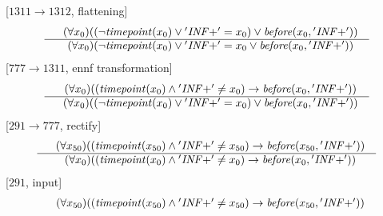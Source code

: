 \documentclass[border=10pt,preview,multi,varwidth=\maxdimen]{standalone}
\newenvironment{VampireStep}{}{}
\newenvironment{VampireInference}{%
   \begin{array}{c}}{\end{array}}
\newenvironment{VampirePremise}%
   {\begin{array}{l}}%
   {\end{array}}
\newenvironment{VampireConclusion}%
   {\begin{array}{l}}%
   {\end{array}}
\newcommand{\VConclusionSeparator}{\\ \hline}
\newcommand{\Vor}{\vee}
\newcommand{\Vand}{\wedge}
\newcommand{\Vimp}{\rightarrow}
\begin{document}
\begin{VampireStep}
[$1311\rightarrow 1312$, flattening]\\
\[\begin{VampireInference}
\begin{VampirePremise}%
~~(\forall x_{0} )((\neg \mathit{timepoint} (x_{0}) \Vor \mathit{'INF+'} = x_{0}) \Vor \mathit{before} (x_{0},\mathit{'INF+'}))
\end{VampirePremise}
\VConclusionSeparator
\begin{VampireConclusion}
~~(\forall x_{0} )(\neg \mathit{timepoint} (x_{0}) \Vor \mathit{'INF+'} = x_{0} \Vor \mathit{before} (x_{0},\mathit{'INF+'}))
\end{VampireConclusion}
\end{VampireInference}
\]
\end{VampireStep}
\begin{VampireStep}
[$777\rightarrow 1311$, ennf transformation]\\
\[\begin{VampireInference}
\begin{VampirePremise}%
~~(\forall x_{0} )((\mathit{timepoint} (x_{0}) \Vand \mathit{'INF+'} \neq x_{0}) \Vimp \mathit{before} (x_{0},\mathit{'INF+'}))
\end{VampirePremise}
\VConclusionSeparator
\begin{VampireConclusion}
~~(\forall x_{0} )((\neg \mathit{timepoint} (x_{0}) \Vor \mathit{'INF+'} = x_{0}) \Vor \mathit{before} (x_{0},\mathit{'INF+'}))
\end{VampireConclusion}
\end{VampireInference}
\]
\end{VampireStep}
\begin{VampireStep}
[$291\rightarrow 777$, rectify]\\
\[\begin{VampireInference}
\begin{VampirePremise}%
~~(\forall x_{50} )((\mathit{timepoint} (x_{50}) \Vand \mathit{'INF+'} \neq x_{50}) \Vimp \mathit{before} (x_{50},\mathit{'INF+'}))
\end{VampirePremise}
\VConclusionSeparator
\begin{VampireConclusion}
~~(\forall x_{0} )((\mathit{timepoint} (x_{0}) \Vand \mathit{'INF+'} \neq x_{0}) \Vimp \mathit{before} (x_{0},\mathit{'INF+'}))
\end{VampireConclusion}
\end{VampireInference}
\]
\end{VampireStep}
\begin{VampireStep}
[$291$, input]\\
\[\begin{VampireInference}
\begin{VampireConclusion}
~~(\forall x_{50} )((\mathit{timepoint} (x_{50}) \Vand \mathit{'INF+'} \neq x_{50}) \Vimp \mathit{before} (x_{50},\mathit{'INF+'}))
\end{VampireConclusion}
\end{VampireInference}
\]
\end{VampireStep}
\end{document}

